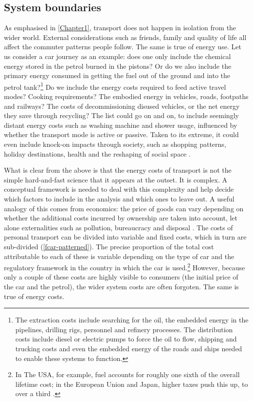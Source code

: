 \documentclass[a4paper, 11pt, twoside]{Thesis}
\begin{document}
\subsection{System boundaries} 
As emphasised in \cref{Chapter1}, transport does not happen in isolation from
the wider world. External considerations such as friends, family and quality of
life all affect the commuter patterns people follow. The same is true of
energy use. Let us consider a car journey as an example: does one only include the
chemical energy stored in the petrol burned in the pistons? Or do we also
include the primary energy consumed in getting the fuel out of the ground and
into the petrol tank?\footnote{The extraction costs include
searching for the oil, the embedded energy in the pipelines, drilling rigs,
personnel and refinery processes. The distribution costs include diesel or
electric pumps to force the oil to flow, shipping and trucking costs and even
the embedded energy of the roads and ships needed to enable these systems to
function.}
Do we include the energy costs required to feed active travel modes? Cooking
requirements? The embodied energy in vehicles, roads, footpaths and railways?
The costs of decommissioning disused vehicles, or the net energy they save
through recycling?
The list could go on and on, to include seemingly distant energy costs such as
washing machine and shower usage, influenced by whether the transport mode is
active or passive. Taken to its extreme, it could even include knock-on impacts
through society, such as shopping patterns, holiday destinations, health and
the reshaping of social space \citep{Illich1974}.

What is clear from the above is that the energy costs of transport is not the
simple hard-and-fast science that it appears at the outset. It is complex. A
conceptual framework is needed to deal with this complexity and help decide
which factors to include in the analysis and which ones to leave out.
A useful analogy of this comes from economics: the price of goods can
vary depending on whether the additional costs incurred by ownership
are taken into account, let alone externalities such as pollution,
bureaucracy and disposal \citep{Perman2003}.
The costs of personal transport can be divided into variable and
fixed costs, which in turn are sub-divided (\cref{fcar-patterned}).
The precise proportion of the total cost attributable to each of these
is variable depending on the type of car and the regulatory framework
in the country in which the car is
used.\footnote{In The USA, for example,
fuel accounts for roughly one sixth of the overall lifetime cost;
in the European Union and Japan, higher taxes push this up, to over a
third \citep{Smil1993}.
}
However, because only a couple of these costs are highly
visible to consumers
(the initial price of the car and the petrol), the wider system costs are often
forgoten. The same is true of energy costs. 
\end{document}
